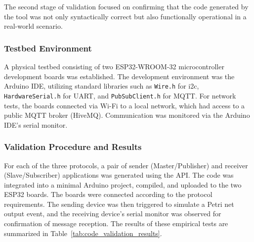   The second stage of validation focused on confirming that the code generated by the tool was not only syntactically correct but also functionally operational in a real-world scenario.

\subsubsection{Testbed Environment}
  A physical testbed consisting of two ESP32-WROOM-32 microcontroller development boards was established. The development environment was the Arduino IDE, utilizing standard libraries such as \texttt{Wire.h} for \gls{i2c}, \texttt{HardwareSerial.h} for UART, and \texttt{PubSubClient.h} for MQTT. For network tests, the boards connected via Wi-Fi to a local network, which had access to a public MQTT broker (HiveMQ). Communication was monitored via the Arduino IDE's serial monitor.

\subsubsection{Validation Procedure and Results}
For each of the three protocols, a pair of sender (Master/Publisher) and receiver (Slave/Subscriber) applications was generated using the API.   The code was integrated into a minimal Arduino project, compiled, and uploaded to the two ESP32 boards.   The boards were connected according to the protocol requirements.   The sending device was then triggered to simulate a Petri net output event, and the receiving device's serial monitor was observed for confirmation of message reception. The results of these empirical tests are summarized in Table~\ref{tab:code_validation_results}.

